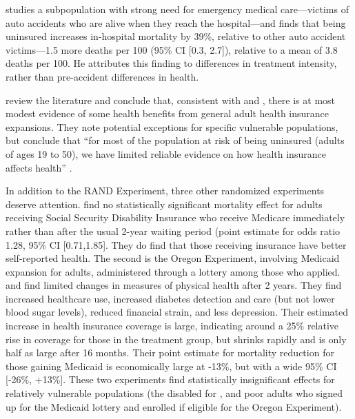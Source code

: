\documentclass[12pt]{article}%
\begin{document}
\citet{doyleHealthInsuranceTreatment2005} studies a subpopulation with strong need for emergency medical care---victims of auto accidents who are alive when they reach the hospital---and finds that being uninsured increases in-hospital mortality by 39\%, relative to other auto accident victims---1.5 more deaths per 100 (95\% CI [0.3, 2.7]), relative to a mean of 3.8 deaths per 100. 
He attributes this finding to differences in treatment intensity, rather than pre-accident differences in health. 

\citet{levyWhatWeReally2004,levyImpactHealthInsurance2008} review the literature and conclude that, consistent with \citet{finkelsteinWhatDidMedicare2008} and \citet{cardImpactNearlyUniversal2004}, there is at most modest evidence of some health benefits from general adult health insurance expansions. 
They note potential exceptions for specific vulnerable populations, but conclude that ``for most of the population at risk of being uninsured (adults of ages 19 to 50), we have limited reliable evidence on how health insurance affects health'' \citep[p.404]{levyImpactHealthInsurance2008}.

In addition to the RAND Experiment, three other randomized experiments deserve attention. 
\citet{weathersEffectExpandingAccess2012} find no statistically significant mortality effect for adults receiving Social Security Disability Insurance who receive Medicare immediately rather than after the usual 2-year waiting period (point estimate for odds ratio 1.28, 95\% CI [0.71,1.85].  
They do find that those receiving insurance have better self-reported health.  
The second is the Oregon Experiment, involving Medicaid expansion for adults, administered through a lottery among those who applied. 
\citet{finkelsteinOregonHealthInsurance2012c} and \citet{baickerOregonExperimentEffects2013} find limited changes in measures of physical health after 2 years.  
They find increased healthcare use, increased diabetes detection and care (but not lower blood sugar levels), reduced financial strain, and less depression.  
Their estimated increase in health insurance coverage is large, indicating around a 25\% relative rise in coverage for those in the treatment group, but shrinks rapidly and is only half as large after 16 months.  
Their point estimate for mortality reduction for those gaining Medicaid is economically large  at -13\%, but with a wide 95\% CI [-26\%, +13\%].  
These two experiments find statistically insignificant effects for relatively vulnerable populations (the disabled for \citet{weathersEffectExpandingAccess2012}, and poor adults who signed up for the Medicaid lottery and enrolled if eligible for the Oregon Experiment).
\end{document}
